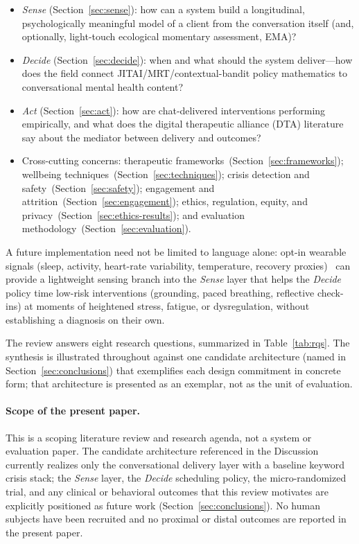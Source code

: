 \documentclass[11pt,a4paper]{article}
\newcommand{\tabref}[1]{Table~\ref{#1}}
\begin{document}
\begin{itemize}\setlength{\itemsep}{0pt}
  \item \emph{Sense} (Section~\ref{sec:sense}): how can a system
    build a longitudinal, psychologically meaningful model of a
    client from the conversation itself (and, optionally, light-touch
    ecological momentary assessment, EMA)?
  \item \emph{Decide} (Section~\ref{sec:decide}): when and what
    should the system deliver---how does the field connect
    JITAI/MRT/contextual-bandit policy mathematics to conversational
    mental health content?
  \item \emph{Act} (Section~\ref{sec:act}): how are chat-delivered
    interventions performing empirically, and what does the digital
    therapeutic alliance (DTA) literature say about the mediator
    between delivery and outcomes?
  \item Cross-cutting concerns: therapeutic
    frameworks~(Section~\ref{sec:frameworks});
    wellbeing techniques~(Section~\ref{sec:techniques}); crisis
    detection and safety~(Section~\ref{sec:safety});
    engagement and attrition~(Section~\ref{sec:engagement}); ethics,
    regulation, equity, and privacy~(Section~\ref{sec:ethics-results});
    and evaluation methodology~(Section~\ref{sec:evaluation}).
\end{itemize}

A future implementation need not be limited to language alone:
opt-in wearable signals (sleep, activity, heart-rate variability,
temperature, recovery
proxies)~\cite{Sequeira2021PassiveSensing,Laborde2017HRV} can
provide a lightweight sensing branch into the \emph{Sense} layer
that helps the \emph{Decide} policy time low-risk interventions
(grounding, paced breathing, reflective check-ins) at moments of
heightened stress, fatigue, or dysregulation, without establishing
a diagnosis on their own.

The review answers eight research questions, summarized in
\tabref{tab:rqs}. The synthesis is illustrated throughout against
one candidate architecture (named in Section~\ref{sec:conclusions})
that exemplifies each design commitment in concrete form; that
architecture is presented as an exemplar, not as the unit of
evaluation.

\paragraph{Scope of the present paper.}
This is a scoping literature review and research agenda, not a
system or evaluation paper. The candidate architecture referenced
in the Discussion currently realizes only the conversational
delivery layer with a baseline keyword crisis stack; the
\emph{Sense} layer, the \emph{Decide} scheduling policy, the
micro-randomized trial, and any clinical or behavioral outcomes
that this review motivates are explicitly positioned as future work
(Section~\ref{sec:conclusions}). No human subjects have been
recruited and no proximal or distal outcomes are reported in the
present paper.
\end{document}
